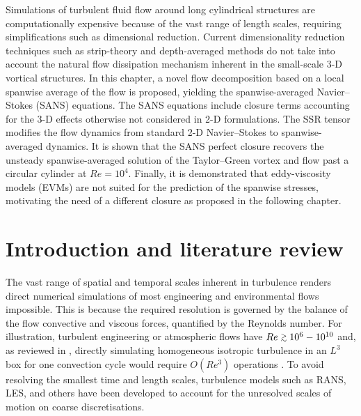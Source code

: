 \documentclass[../main.tex]{subfiles}
\begin{document}
\vspace{0.25cm}
Simulations of turbulent fluid flow around long cylindrical structures are computationally expensive because of the vast range of length scales, requiring simplifications such as dimensional reduction.
Current dimensionality reduction techniques such as strip-theory and depth-averaged methods do not take into account the natural flow dissipation mechanism inherent in the small-scale 3-D vortical structures.
In this chapter, a novel flow decomposition based on a local spanwise average of the flow is proposed, yielding the spanwise-averaged Navier--Stokes (SANS) equations.
The SANS equations include closure terms accounting for the 3-D effects otherwise not considered in 2-D formulations.
The SSR tensor modifies the flow dynamics from standard 2-D Navier--Stokes to spanwise-averaged dynamics.
It is shown that the SANS perfect closure recovers the unsteady spanwise-averaged solution of the Taylor--Green vortex and flow past a circular cylinder at $Re=10^4$.
Finally, it is demonstrated that eddy-viscosity models (EVMs) are not suited for the prediction of the spanwise stresses, motivating the need of a different closure as proposed in the following chapter.

\section{Introduction and literature review}

The vast range of spatial and temporal scales inherent in turbulence renders direct numerical simulations of most engineering and environmental flows impossible.
This is because the required resolution is governed by the balance of the flow convective and viscous forces, quantified by the Reynolds number.
For illustration, turbulent engineering or atmospheric flows have $Re\smallgtrsim 10^6-10^{10}$ and, as reviewed in , directly simulating homogeneous isotropic turbulence in an $L^3$ box for one convection cycle would require $O(Re^3)$ operations \citep[p. 346]{Coleman2010,Pope2000}.
To avoid resolving the smallest time and length scales, turbulence models such as RANS, LES, and others have been developed to account for the unresolved scales of motion on coarse discretisations.
\end{document}

